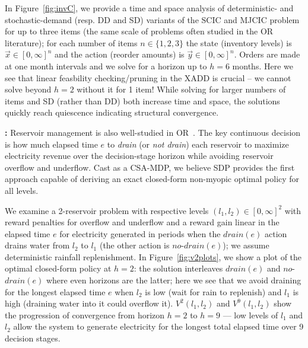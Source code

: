 In Figure~\ref{fig:invC}, we provide a time and space analysis of
deterministic- and stochastic-demand (resp. DD and SD) variants of the
SCIC and MJCIC problem for up to three items (the same scale of
problems often studied in the OR literature); for each number of items
$n \in \{ 1,2,3 \}$ the state (inventory levels) is $\vec{x} \in
[0,\infty]^n$ and the action (reorder amounts) is $\vec{y} \in
[0,\infty]^n$.  Orders are made at one month intervals and we solve
for a horizon up to $h=6$ months.  Here we see that linear feasbility
checking/pruning in the XADD is crucial -- we cannot solve beyond
$h=2$ without it for 1 item!  While solving for larger numbers of
items and SD (rather than DD) both increase time and space, 
the solutions quickly reach quiescence indicating structural
convergence.


{\bf \WaterReservoir:} Reservoir management is also well-studied in
OR~\cite{Mahootchi2009,Yeh1985}.  The key continuous decision is how
much elapsed time $e$ to
\emph{drain} (or \emph{not drain}) each reservoir to maximize
electricity revenue over the decision-stage horizon while avoiding
reservoir overflow and underflow.  Cast as a CSA-MDP, we 
believe SDP provides the first approach capable of deriving
an exact closed-form non-myopic optimal policy
for all levels.

We examine a 2-reservoir problem with
respective levels $(l_1,l_2)\in [0,\infty]^2$ with reward penalties for 
overflow and underflow and a reward gain linear in the elapsed time $e$ for
electricity generated in periods when the $\mathit{drain}(e)$ action
drains water from $l_2$ to $l_1$ (the other action is 
$\mathit{no}$-$\mathit{drain}(e)$); we assume deterministic rainfall
replenishment.  In Figure~\ref{fig:v2plots}, we show a plot of 
the optimal closed-form policy
at $h=2$: the solution interleaves $\mathit{drain}(e)$ and 
$\mathit{no}$-$\mathit{drain}(e)$ where even horizons are the latter;
here we see that we avoid draining for the longest elapsed time $e$ 
when $l_2$ is low (wait for rain to replenish) and $l_1$ is high (draining
water into it could overflow it).  $V^2(l_1,l_2)$ and $V^9(l_1,l_2)$
show the progression of convergence from horizon $h=2$ to $h=9$ ---
low levels of $l_1$ and $l_2$ allow the system to generate electricity
for the longest total elapsed time over 9 decision stages.


